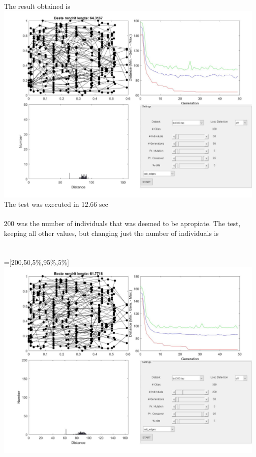 The result obtained is
\includegraphics[width=\textwidth]{img/specific/xalt_edges/general_1.jpg}\\
The test was executed in 12.66 sec\\
\\
200 was the number of individuals that was deemed to be apropiate. 
The test, keeping all other values, but changing just the number of
individuals is \\
\\
\\
 =[200,50,5\%,95\%,5\%] \\
\includegraphics[width=\textwidth]{img/specific/xalt_edges/general_2.jpg}\\

